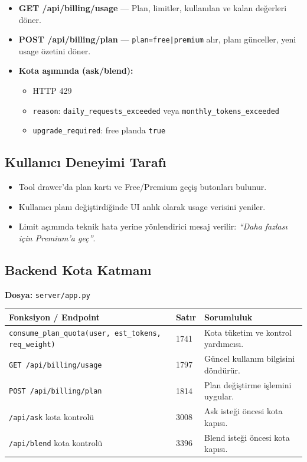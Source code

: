 \documentclass[11pt,a4paper]{article}
\begin{document}
\begin{notebox}
\begin{itemize}[leftmargin=1.2em,nosep]
  \item \textbf{GET /api/billing/usage} — Plan, limitler, kullanılan ve kalan değerleri döner.
  \item \textbf{POST /api/billing/plan} — \texttt{plan=free|premium} alır, planı günceller, yeni usage özetini döner.
  \item \textbf{Kota aşımında (ask/blend):}
    \begin{itemize}[leftmargin=1.2em,nosep]
      \item HTTP 429
      \item \texttt{reason}: \texttt{daily\_requests\_exceeded} veya \texttt{monthly\_tokens\_exceeded}
      \item \texttt{upgrade\_required}: free planda \texttt{true}
    \end{itemize}
\end{itemize}
\end{notebox}

\subsection{Kullanıcı Deneyimi Tarafı}
\begin{itemize}[leftmargin=1.5em]
  \item Tool drawer'da plan kartı ve Free/Premium geçiş butonları bulunur.
  \item Kullanıcı planı değiştirdiğinde UI anlık olarak usage verisini yeniler.
  \item Limit aşımında teknik hata yerine yönlendirici mesaj verilir: \textit{``Daha fazlası için Premium'a geç''}.
\end{itemize}

\subsection{Backend Kota Katmanı}

\textbf{Dosya:} \texttt{server/app.py}

\begin{tabularx}{\textwidth}{@{} L{5cm} L{1.8cm} X @{}}
\toprule
\textbf{Fonksiyon / Endpoint} & \textbf{Satır} & \textbf{Sorumluluk} \\
\midrule
\texttt{consume\_plan\_quota(user, est\_tokens, req\_weight)} & 1741 & Kota tüketim ve kontrol yardımcısı. \\
\addlinespace
\texttt{GET /api/billing/usage} & 1797 & Güncel kullanım bilgisini döndürür. \\
\addlinespace
\texttt{POST /api/billing/plan} & 1814 & Plan değiştirme işlemini uygular. \\
\addlinespace
\texttt{/api/ask} kota kontrolü & 3008 & Ask isteği öncesi kota kapısı. \\
\addlinespace
\texttt{/api/blend} kota kontrolü & 3396 & Blend isteği öncesi kota kapısı. \\
\bottomrule
\end{tabularx}
\end{document}
